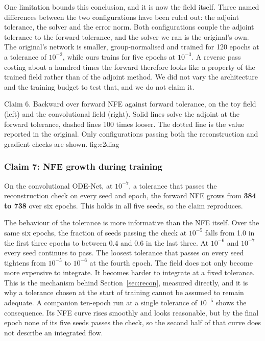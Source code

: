 One limitation bounds this conclusion, and it is now the field itself. Three named differences between the two configurations have been ruled out: the adjoint
tolerance, the solver and the error norm. Both configurations couple the adjoint tolerance to the
forward tolerance, and the solver we ran is the original's own. The
original's network is smaller, group-normalised and trained for 120 epochs at a tolerance of
$10^{-2}$, while ours trains for five epochs at $10^{-3}$. A reverse pass costing about a
hundred times the forward therefore looks like a property of the trained field rather than of
the adjoint method. We did not vary the architecture and the training budget to test that, and
we do not claim it.

  {Claim 6. Backward over forward NFE against forward tolerance, on the toy field (left) and
   the convolutional field (right). Solid lines solve the adjoint at the forward tolerance,
   dashed lines 100 times looser. The dotted line is the value reported in the original. Only
   configurations passing both the reconstruction and gradient checks are shown.}
  {fig:c2diag}

\subsubsection{Claim 7: NFE growth during training}

On the convolutional ODE-Net, at $10^{-7}$, a tolerance that passes the reconstruction check on
every seed and epoch, the forward NFE grows from \textbf{384 to 738} over six epochs. This
holds in all five seeds, so the claim reproduces.

The behaviour of the tolerance is more informative than the NFE itself. Over the same six
epochs, the fraction of seeds passing the check at $10^{-5}$ falls from 1.0 in the first three epochs to between 0.4 and 0.6 in the last three. At
$10^{-6}$ and $10^{-7}$ every seed continues to pass.
The loosest tolerance that passes on every seed tightens from $10^{-5}$ to $10^{-6}$ at the
fourth epoch. The field does not only become more expensive to
integrate. It becomes harder to integrate at a fixed tolerance. This is the mechanism behind
Section~\ref{sec:recon}, measured directly, and it is why a tolerance chosen at the start of
training cannot be assumed to remain adequate. A companion ten-epoch run at a single tolerance
of $10^{-5}$ shows the consequence. Its NFE curve rises smoothly and looks reasonable, but by
the final epoch none of its five seeds passes the check, so the second half of that curve does
not describe an integrated flow.

